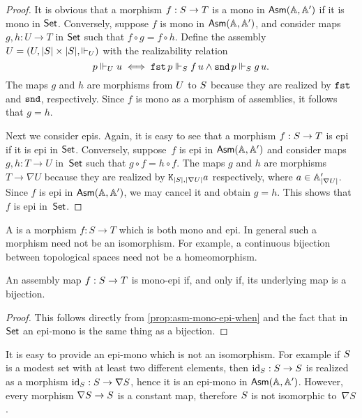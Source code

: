 \begin{proof}
  It is obvious that a morphism $f : \asm{S} \to \asm{T}$ is a mono in
  $\AsmA$ if it is mono in $\Set$. Conversely, suppose $f$ is mono in
  $\AsmA$, and consider maps $g, h : U \to T$ in $\Set$ such that $f
  \circ g = f \circ h$. Define the assembly $\asm{U} = (U, |S| \times
  |S|, {\rz[U]})$ with the realizability relation
  \begin{equation*}
    p \rz[U] u
    \iff \combFst\,p \rz[S] f\,u \land \combSnd\,p \rz[S] g\,u.
  \end{equation*}
  The maps $g$ and $h$ are morphisms from $\asm{U}$ to $\asm{S}$
  because they are realized by $\combFst$ and $\combSnd$,
  respectively. Since $f$ is mono as a morphism of assemblies, it
  follows that $g = h$.

  Next we consider epis. Again, it is easy to see that a morphism $f :
  \asm{S} \to \asm{T}$ is epi if it is epi in $\Set$. Conversely,
  suppose~$f$ is epi in $\AsmA$ and consider maps $g, h : T \to U$
  in~$\Set$ such that $g \circ f = h \circ f$. The maps $g$ and $h$
  are morphisms $T \to \nabla U$ because they are realized by
  $\combK_{|S|,|\nabla U|} a$ respectively, where $a \in
  \subAtyp{|\nabla U|}$. Since $f$ is epi in $\AsmA$, we may cancel
  it and obtain $g = h$. This shows that $f$ is epi in~$\Set$.
\end{proof}

A  is a morphism $f : S \to T$ which is both mono and
epi. In general such a morphism need not be an isomorphism. For
example, a continuous bijection between topological spaces need not be
a homeomorphism.

\begin{corollary}
  An assembly map $f : \asm{S} \to \asm{T}$ is mono-epi if, and only
  if, its underlying map is a bijection.
\end{corollary}

\begin{proof}
  This follows directly from \cref{prop:asm-mono-epi-when}
  and the fact that in $\Set$ an epi-mono is the same thing as a
  bijection.
\end{proof}

It is easy to provide an epi-mono which is not an isomorphism. For
example if $\asm{S}$ is a modest set with at least two different
elements, then $\id[S] : S \to S$ is realized as a morphism $\id[S] :
\asm{S} \to \nabla S$, hence it is an epi-mono in $\AsmA$. However,
every morphism $\nabla S \to \asm{S}$ is a constant map, therefore
$\asm{S}$ is not isomorphic to~$\nabla{S}$.

